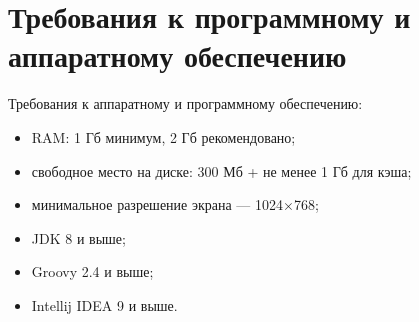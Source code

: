\section{Требования к программному и аппаратному обеспечению} \label{sub23}

Требования к аппаратному и программному обеспечению: 

\begin{itemize}
\item{RAM: 1 Гб минимум, 2 Гб рекомендовано;}
\item{свободное место на диске: 300 Мб + не менее 1 Гб для кэша;}
\item{минимальное разрешение экрана — 1024$\times$768;}
\item{JDK 8 и выше;}
\item{Groovy 2.4 и выше;}
\item{Intellij IDEA 9 и выше.}
\end{itemize}
